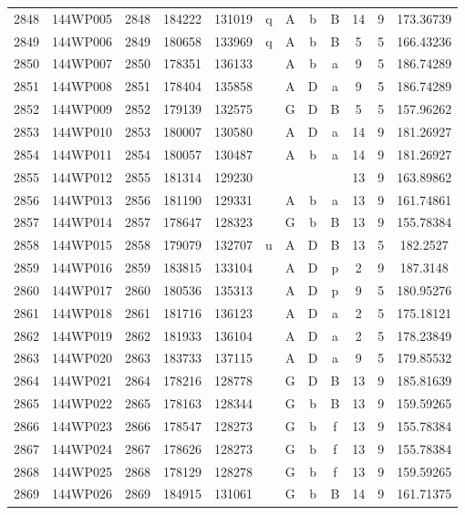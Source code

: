 \begin{tabular}{|*{12}{c|}}
2848 & 144WP005 & 2848 & 184222 & 131019 & q & A & b & B & 14 & 9 & 173.36739 \\ 
2849 & 144WP006 & 2849 & 180658 & 133969 & q & A & b & B & 5 & 5 & 166.43236 \\ 
2850 & 144WP007 & 2850 & 178351 & 136133 &  & A & b & a & 9 & 5 & 186.74289 \\ 
2851 & 144WP008 & 2851 & 178404 & 135858 &  & A & D & a & 9 & 5 & 186.74289 \\ 
2852 & 144WP009 & 2852 & 179139 & 132575 &  & G & D & B & 5 & 5 & 157.96262 \\ 
2853 & 144WP010 & 2853 & 180007 & 130580 &  & A & D & a & 14 & 9 & 181.26927 \\ 
2854 & 144WP011 & 2854 & 180057 & 130487 &  & A & b & a & 14 & 9 & 181.26927 \\ 
2855 & 144WP012 & 2855 & 181314 & 129230 &  &  &  &  & 13 & 9 & 163.89862 \\ 
2856 & 144WP013 & 2856 & 181190 & 129331 &  & A & b & a & 13 & 9 & 161.74861 \\ 
2857 & 144WP014 & 2857 & 178647 & 128323 &  & G & b & B & 13 & 9 & 155.78384 \\ 
2858 & 144WP015 & 2858 & 179079 & 132707 & u & A & D & B & 13 & 5 & 182.2527 \\ 
2859 & 144WP016 & 2859 & 183815 & 133104 &  & A & D & p & 2 & 9 & 187.3148 \\ 
2860 & 144WP017 & 2860 & 180536 & 135313 &  & A & D & p & 9 & 5 & 180.95276 \\ 
2861 & 144WP018 & 2861 & 181716 & 136123 &  & A & D & a & 2 & 5 & 175.18121 \\ 
2862 & 144WP019 & 2862 & 181933 & 136104 &  & A & D & a & 2 & 5 & 178.23849 \\ 
2863 & 144WP020 & 2863 & 183733 & 137115 &  & A & D & a & 9 & 5 & 179.85532 \\ 
2864 & 144WP021 & 2864 & 178216 & 128778 &  & G & D & B & 13 & 9 & 185.81639 \\ 
2865 & 144WP022 & 2865 & 178163 & 128344 &  & G & b & B & 13 & 9 & 159.59265 \\ 
2866 & 144WP023 & 2866 & 178547 & 128273 &  & G & b & f & 13 & 9 & 155.78384 \\ 
2867 & 144WP024 & 2867 & 178626 & 128273 &  & G & b & f & 13 & 9 & 155.78384 \\ 
2868 & 144WP025 & 2868 & 178129 & 128278 &  & G & b & f & 13 & 9 & 159.59265 \\ 
2869 & 144WP026 & 2869 & 184915 & 131061 &  & G & b & B & 14 & 9 & 161.71375 \\ 

\end{tabular}
